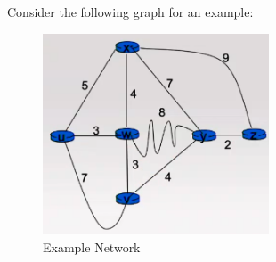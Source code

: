 \documentclass[a4paper]{article}
\theoremstyle{plain}
\theoremstyle{definition}
\newtheorem{exmp}{Example}[section]
\theoremstyle{remark}
\begin{document}
\begin{tcolorbox}[colback=black!3!white,breakable,enhanced,colframe=black!60!white,title=\begin{exmp}Dijkstra's Algorithm \label{Dijkstra's Algorithm}\end{exmp}]
        Consider the following graph for an example:
	\begin{figure}[H]
		\centering
		\includegraphics[width=0.6\textwidth]{eightyone.png}
		\caption{Example Network}
		\label{fig:eightyone-png}
	\end{figure}


\end{tcolorbox}
\end{document}
